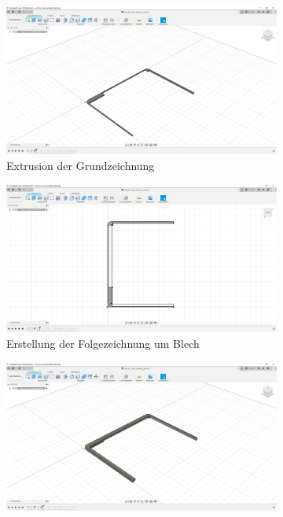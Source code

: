 \begin{figure}[h!tb]
	\begin{subfigure}[t]{.3\linewidth}
		\includegraphics[width=\linewidth]{img/konstruktion_gehaeuse_links_001.png}
		\caption[Extrusion der Grundzeichnung]{Extrusion der Grundzeichnung}
		\label{fig:design-left-01}
	\end{subfigure}
	\begin{subfigure}[t]{.3\linewidth}
		\includegraphics[width=\linewidth]{img/konstruktion_gehaeuse_links_002.png}
		\caption[Erstellung der Folgezeichnung um Blech]{Erstellung der Folgezeichnung um Blech}
		\label{fig:design-left-02}
	\end{subfigure}
	\begin{subfigure}[t]{.3\linewidth}
		\includegraphics[width=\linewidth]{img/konstruktion_gehaeuse_links_003.png}

\end{subfigure}
\end{figure}
